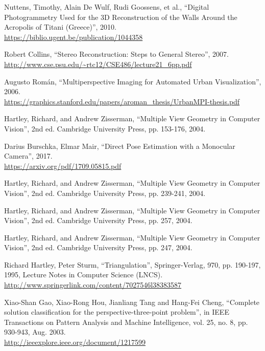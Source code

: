 \documentclass[11pt, a4paper, openany]{article}
\begin{document}
% 
\begin{thebibliography}{5}
Nuttens, Timothy, Alain De Wulf, Rudi Goossens, et al., ``Digital Photogrammetry Used for the 3D Reconstruction of the Walls Around the Acropolis of Titani (Greece)'', 2010.\\
\url{https://biblio.ugent.be/publication/1044358}

Robert Collins, ``Stereo Reconstruction: Steps to General Stereo'', 2007.\\
\url{http://www.cse.psu.edu/~rtc12/CSE486/lecture21_6pp.pdf}

Augusto Román, ``Multiperspective Imaging for Automated Urban Visualization'', 2006.\\
\url{https://graphics.stanford.edu/papers/aroman_thesis/UrbanMPI-thesis.pdf}

Hartley, Richard, and Andrew Zisserman, ``Multiple View Geometry in Computer Vision'', 2nd ed. Cambridge University Press, pp. 153-176, 2004.

Darius Burschka, Elmar Mair, ``Direct Pose Estimation with a Monocular Camera'', 2017.\\
\url{https://arxiv.org/pdf/1709.05815.pdf}

Hartley, Richard, and Andrew Zisserman, ``Multiple View Geometry in Computer Vision'', 2nd ed. Cambridge University Press, pp. 239-241, 2004.

Hartley, Richard, and Andrew Zisserman, ``Multiple View Geometry in Computer Vision'', 2nd ed. Cambridge University Press, pp. 257, 2004.

Hartley, Richard, and Andrew Zisserman, ``Multiple View Geometry in Computer Vision'', 2nd ed. Cambridge University Press, pp. 247, 2004.

Richard Hartley, Peter Sturm, ``Triangulation'', Springer-Verlag, 970, pp. 190-197, 1995, Lecture Notes in Computer Science (LNCS).\\
\url{http://www.springerlink.com/content/7027546l38383587}

Xiao-Shan Gao, Xiao-Rong Hou, Jianliang Tang and Hang-Fei Cheng, ``Complete solution classification for the perspective-three-point problem'', in IEEE Transactions on Pattern Analysis and Machine Intelligence, vol. 25, no. 8, pp. 930-943, Aug. 2003.\\
\url{http://ieeexplore.ieee.org/document/1217599}


\end{thebibliography}
\end{document}
